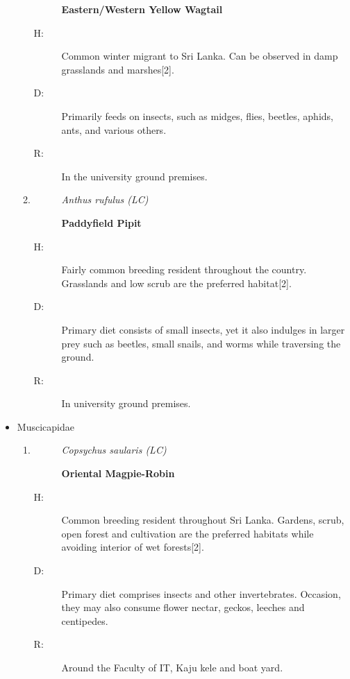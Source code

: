 \begin{itemize}
\begin{enumerate}
\begin{description}
\item[]%
\textbf{Eastern/Western Yellow Wagtail}%
\end{description}%
\begin{description}%
\item[H: ]%
Common winter migrant to Sri Lanka. Can be observed in damp grasslands and marshes{[}2{]}.%
\item[D: ]%
Primarily feeds on insects, such as midges, flies, beetles, aphids, ants, and various others.%
\item[R: ]%
In the university ground premises.%
\end{description}%
\item%
\begin{description}%
\item[]%
\textit{Anthus rufulus (LC)}%
\item[]%
\textbf{Paddyfield Pipit}%
\end{description}%
\begin{description}%
\item[H: ]%
Fairly common breeding resident throughout the country. Grasslands and low scrub are the preferred habitat{[}2{]}.%
\item[D: ]%
Primary diet consists of small insects, yet it also indulges in larger prey such as beetles, small snails, and worms while traversing the ground. %
\item[R: ]%
In university ground premises.%
\end{description}%
\end{enumerate}%
\item%
Muscicapidae%
\begin{enumerate}%
\item%
\begin{description}%
\item[]%
\textit{Copsychus saularis (LC)}%
\item[]%
\textbf{Oriental Magpie{-}Robin}%
\end{description}%
\begin{description}%
\item[H: ]%
Common breeding resident throughout Sri Lanka. Gardens, scrub, open forest and cultivation are the preferred habitats while avoiding interior of wet forests{[}2{]}.%
\item[D: ]%
Primary diet comprises insects and other invertebrates. Occasion, they may also consume flower nectar, geckos, leeches and centipedes.%
\item[R: ]%
Around the Faculty of IT, Kaju kele and boat yard.%

\end{description}
\end{enumerate}
\end{itemize}
